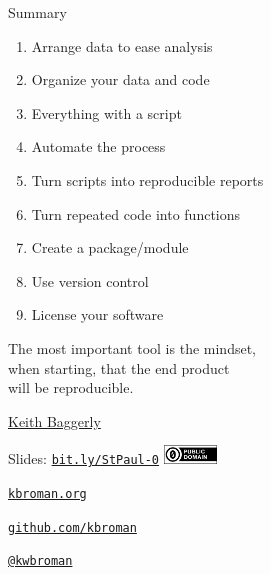 \documentclass[12pt,t]{beamer}
\begin{document}
\begin{frame}[c]{Summary}

\small
    \begin{enumerate}
    \item Arrange data to ease analysis
    \item Organize your data and code
    \item Everything with a script
    \item Automate the process
    \item Turn scripts into reproducible reports
    \item Turn repeated code into functions
    \item Create a package/module
    \item Use version control
    \item License your software
    \end{enumerate}

\end{frame}



\begin{frame}[c]{}

\begin{center}
\large
The most important tool is the {\hilit mindset},\\
when starting, that the end product \\
will be reproducible.
\end{center}

\hfill
{\lolit
{\textendash} \href{http://odin.mdacc.tmc.edu/~kabaggerly/}{Keith Baggerly}
}

\end{frame}



\begin{frame}[c]{}

\Large

Slides: \href{http://bit.ly/StPaul-0}{\tt bit.ly/StPaul-0} \quad
\includegraphics[height=5mm]{Figs/cc-zero.png}

\vspace{10mm}

\href{http://kbroman.org}{\tt kbroman.org}

\vspace{10mm}

\href{https://github.com/kbroman}{\tt github.com/kbroman}

\vspace{10mm}

\href{https://twitter.com/kwbroman}{\tt @kwbroman}


\end{frame}
\end{document}
